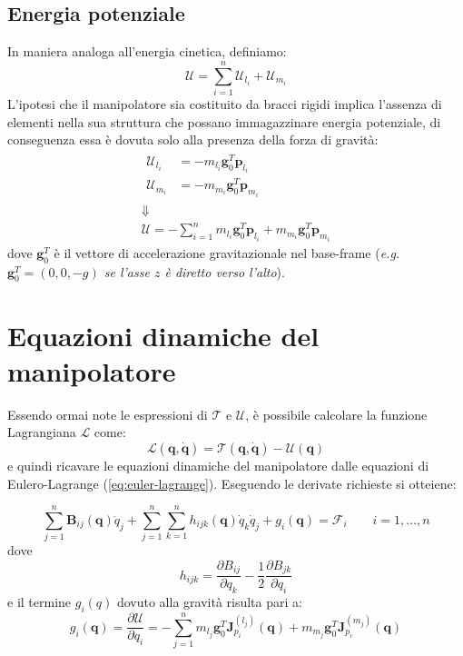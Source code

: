 \subsection{Energia potenziale}
In maniera analoga all'energia cinetica, definiamo:
\begin{equation}\label{eq:pot_energy_sum}
	\mathcal{U} = \sum_{i=1}^n \mathcal{U}_{l_i} + \mathcal{U}_{m_i}
\end{equation}
L’ipotesi che il manipolatore sia costituito da bracci rigidi implica l’assenza di elementi nella sua struttura che possano immagazzinare energia potenziale, di conseguenza essa è dovuta solo alla presenza della forza di gravità:
\begin{gather*}
	\begin{aligned}
		\mathcal{U}_{l_i} &= -m_{l_i}\bm{g}_0^T \bm{p}_{l_i} \\
		\mathcal{U}_{m_i} &= -m_{m_i}\bm{g}_0^T \bm{p}_{m_i}
	\end{aligned} \\
\Downarrow \\
\boxed{
\mathcal{U} = - \sum_{i=1}^n m_{l_i}\bm{g}_0^T \bm{p}_{l_i} + m_{m_i}\bm{g}_0^T \bm{p}_{m_i}
}
\end{gather*}
dove $\bm{g}_0^T$ è il vettore di accelerazione gravitazionale nel base-frame (\textit{e.g. $\bm{g}_0^T = (0,0,-g)$ se l'asse $z$ è diretto verso l'alto}).





\section{Equazioni dinamiche del manipolatore}
Essendo ormai note le espressioni di $\mathcal{T}$ e $\mathcal{U}$, è possibile calcolare la funzione Lagrangiana $\mathcal{L}$ come:
$$
\mathcal{L}(\bm{q}, \bm{\dot{q}})
=
\mathcal{T}(\bm{q}, \bm{\dot{q}})
-
\mathcal{U}(\bm{q})
$$
e quindi ricavare le equazioni dinamiche del manipolatore dalle equazioni di Eulero-Lagrange (\ref{eq:euler-lagrange}). Eseguendo le derivate richieste si otteiene:

\begin{equation}\label{eq:robot_dynamics}
\boxed{\sum_{j=1}^n \bm{B}_{ij}(\bm{q}) \ddot{q}_j
+
\sum_{j=1}^n \sum_{k=1}^n h_{ijk} (\bm{q}) \dot{q}_k \dot{q}_j 
+
g_i(\bm{q})
=
\mathcal{F}_i
\qquad
i = 1, \dots, n
}
\end{equation}
dove
$$
h_{ijk}
=
\frac{\partial B_{ij}}{\partial q_k}
-
\frac{1}{2} \frac{\partial B_{jk}}{\partial q_i}
$$
e il termine $g_i(q)$ dovuto alla gravità risulta pari a:
$$
g_i(\bm{q})
=
\frac{\partial \mathcal{U}}{\partial q_i}
=
-\sum_{j=1}^n m_{l_j}\bm{g}_0^T \bm{J}^{(l_j)}_{p_i}(\bm{q}) + m_{m_j}\bm{g}_0^T  \bm{J}^{(m_j)}_{p_i}(\bm{q})
$$

